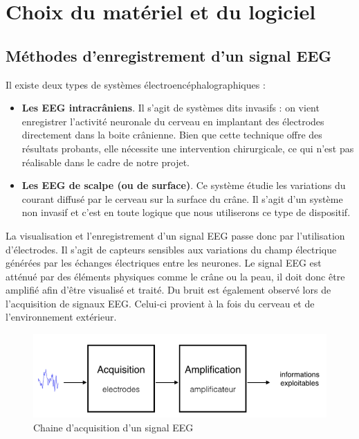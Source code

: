 \chapter{Choix du matériel et du logiciel}
\label{Chapitre:Choix du Hardware et du Software}
\thispagestyle{fancy}

\section{Méthodes d'enregistrement d'un signal EEG}
\label{Section:3.Méthodes d'enregistrement d'un signal EEG}

Il existe deux types de systèmes électroencéphalographiques :
\smallbreak
\begin{itemize}
	\item \textbf{Les EEG intracrâniens}. Il s'agit de systèmes dits invasifs : on vient enregistrer l'activité neuronale du cerveau en implantant des électrodes directement dans la boite crânienne. Bien que cette technique offre des résultats probants, elle nécessite une intervention chirurgicale, ce qui n'est pas réalisable dans le cadre de notre projet. 
	\smallbreak
	\item \textbf{Les EEG de scalpe (ou de surface)}. Ce système étudie les variations du courant diffusé par le cerveau sur la surface du crâne. Il s'agit d'un système non invasif et c'est en toute logique que nous utiliserons ce type de dispositif.

\end{itemize}
\smallbreak
La visualisation et l'enregistrement d'un signal EEG passe donc par l'utilisation d'électrodes. Il s'agit de capteurs sensibles aux variations du champ électrique générées par les échanges électriques entre les neurones. Le signal EEG est atténué par des éléments physiques comme le crâne ou la peau, il doit donc être amplifié afin d'être visualisé et traité. Du bruit est également observé lors de l'acquisition de signaux EEG. Celui-ci provient à la fois du cerveau et de l'environnement extérieur. 

\begin{figure}[h]
	\centering\includegraphics[width=14cm]{images/chaineSignal.png}
	\caption{Chaine d'acquisition d'un signal EEG}
	\label{fig:GRASS}
\end{figure}

